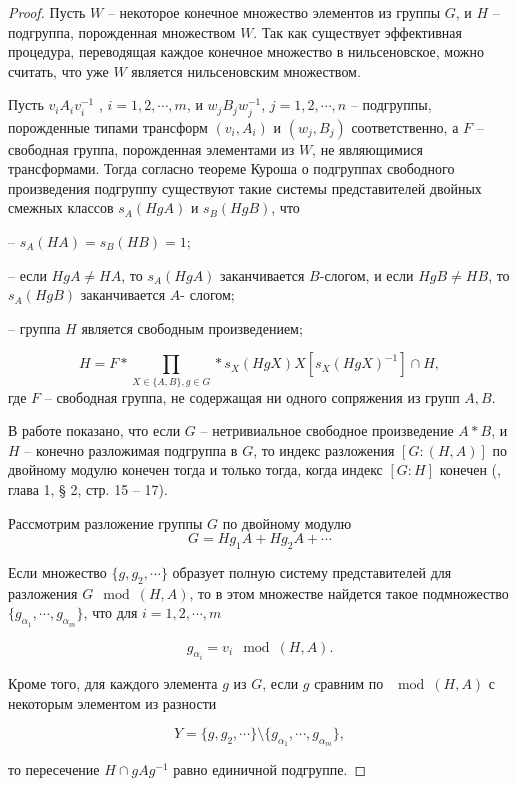 \documentclass[twoside]{mfitjournal}
\begin{document}
\begin{proof}

Пусть $W$ -- некоторое конечное множество элементов из группы $G$, и $H$ -- подгруппа, порожденная множеством $W$. Так как существует эффективная процедура, переводящая каждое конечное множество в нильсеновское, можно считать, что уже $W$ является нильсеновским множеством.

Пусть $ v_iA_iv^{-1}_i$ , $i = 1, 2,\cdots, m$, и  $ w_j B_jw^{-1}_j $, $j = 1, 2,\cdots, n$ -- подгруппы, порожденные типами трансформ $\left(v_i,A_i\right)$   и  $ \left(w_j,B_j\right) $  соответственно, а $F$ -- свободная группа, порожденная элементами из $W$, не являющимися трансформами. Тогда согласно теореме Куроша о подгруппах свободного произведения подгруппу существуют такие системы представителей двойных смежных классов $s_A(HgA)$ и $s_B(HgB)$, что

–  $s_A(HA) = s_B(HB) = 1$;

–  если $HgA \neq HA$, то $s_A(HgA)$ заканчивается $B$-слогом, и если $HgB\neq HB$, то $s_A(HgB)$ заканчивается $A$- слогом;

–  группа $H$ является свободным произведением;

\[
H=F \ast \prod\limits_{{X \in \{A,B\}},{g \in G}} \ast s_X\left(HgX\right)X\left[s_X\left(HgX\right)^{-1}\right] \cap H,  
\]
где $F$ -- свободная группа, не содержащая ни одного сопряжения из групп $A, B$.

В работе \cite{Gor} показано, что если $G$ – нетривиальное свободное произведение $A \ast B$, и $H$ -- конечно разложимая подгруппа в $G$, то индекс разложения $[G : (H, A)]$  по двойному модулю конечен тогда и только тогда, когда индекс $[G: H]$ конечен (\cite{Gor}, глава 1, § 2, стр. 15 – 17).

Рассмотрим разложение группы $G$ по двойному модулю
\[
G = Hg_1A + Hg_2A +\cdots
\]

Если множество $\{g, g_2,\cdots\}$ образует полную систему представителей для разложения $G\mod(H, A)$, то в этом множестве найдется такое подмножество $\{g_{\alpha_1},\cdots,g_{\alpha_m}\}$, что для $i = 1, 2,\cdots, m$

\[
g_{\alpha_i}=v_i \mod(H,A).
\]

Кроме того, для каждого элемента $g$ из $G$, если $g$ сравним по $\mod(H, A)$ с некоторым элементом из разности

\[
Y=\{g,g_2,\cdots\}\setminus\{g_{\alpha_1},\cdots,g_{\alpha_m}\},
\]

то пересечение $H \cap gAg^{-1}$ равно единичной подгруппе.


\end{proof}
\end{document}
